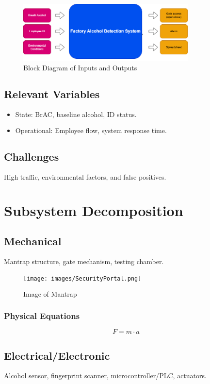 \documentclass[a4paper,12pt]{article}
\begin{document}
\begin{figure}[H]
    \centering
    \includegraphics[width=0.8\textwidth]{images/flowChart.png}
    \caption{Block Diagram of Inputs and Outputs}
\end{figure}

\subsection{Relevant Variables}
\begin{itemize}
    \item State: BrAC, baseline alcohol, ID status.
    \item Operational: Employee flow, system response time.
\end{itemize}

\subsection{Challenges}
High traffic, environmental factors, and false positives.

\section{Subsystem Decomposition}
\subsection{Mechanical}
Mantrap structure, gate mechanism, testing chamber.

\begin{figure}[H]
    \centering
    \texttt{[image: images/SecurityPortal.png]}
    \caption{Image of Mantrap}
\end{figure}

\subsubsection{Physical Equations}
\begin{equation}
    F = m \cdot a
\end{equation}

\subsection{Electrical/Electronic}
Alcohol sensor, fingerprint scanner, microcontroller/PLC, actuators.
\end{document}
